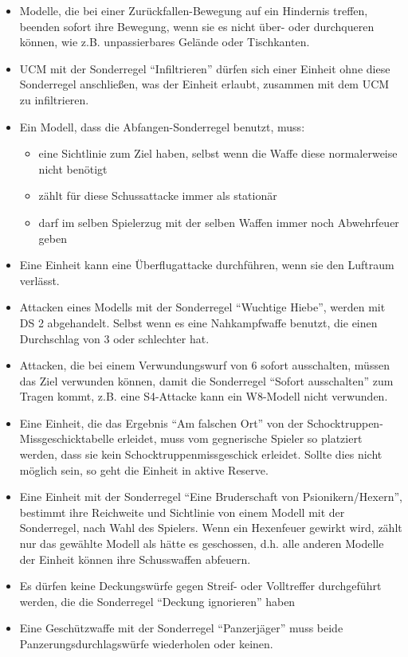 \begin{itemize}

 \item Modelle, die bei einer Zurückfallen-Bewegung auf ein Hindernis treffen,
  beenden sofort ihre Bewegung, wenn sie es nicht über- oder durchqueren können,
  wie z.B.  unpassierbares Gelände oder Tischkanten.

 \item UCM mit der Sonderregel ``Infiltrieren'' dürfen sich einer Einheit ohne
  diese Sonderregel anschließen, was der Einheit erlaubt, zusammen mit dem UCM
  zu infiltrieren.

 \item Ein Modell, dass die Abfangen-Sonderregel benutzt, muss:
\begin{itemize}
 \item eine Sichtlinie zum Ziel haben, selbst wenn die Waffe diese normalerweise
  nicht benötigt
 \item zählt für diese Schussattacke immer als stationär
 \item darf im selben Spielerzug mit der selben Waffen immer noch Abwehrfeuer
  geben
\end{itemize}

\item Eine Einheit kann eine Überflugattacke durchführen, wenn sie den Luftraum
 verlässt.

\item Attacken eines Modells mit der Sonderregel ``Wuchtige Hiebe'', werden mit DS
 2 abgehandelt. Selbst wenn es eine Nahkampfwaffe benutzt, die einen Durchschlag
 von 3 oder schlechter hat.

\item Attacken, die bei einem Verwundungswurf von 6 sofort ausschalten, müssen
 das Ziel verwunden können, damit die Sonderregel ``Sofort ausschalten'' zum
 Tragen kommt, z.B. eine S4-Attacke kann ein W8-Modell nicht verwunden.

\item Eine Einheit, die das Ergebnis ``Am falschen Ort'' von der
 Schocktruppen-Missgeschicktabelle erleidet, muss vom gegnerische Spieler so
 platziert werden, dass sie kein Schocktruppenmissgeschick erleidet. Sollte dies
 nicht möglich sein, so geht die Einheit in aktive Reserve.

\item Eine Einheit mit der Sonderregel ``Eine Bruderschaft von
 Psionikern/Hexern'', bestimmt ihre Reichweite und Sichtlinie von einem Modell
 mit der Sonderregel, nach Wahl des Spielers. Wenn ein Hexenfeuer gewirkt wird,
 zählt nur das gewählte Modell als hätte es geschossen, d.h. alle anderen
 Modelle der Einheit können ihre Schusswaffen abfeuern.

\item Es dürfen keine Deckungswürfe gegen Streif- oder Volltreffer durchgeführt
 werden, die die Sonderregel ``Deckung ignorieren'' haben

\item Eine Geschützwaffe mit der Sonderregel ``Panzerjäger'' muss beide
 Panzerungsdurchlagswürfe wiederholen oder keinen.

\end{itemize}

